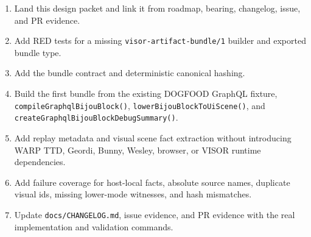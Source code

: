 \begin{enumerate}
\def\labelenumi{\arabic{enumi}.}
\tightlist
\item
  Land this design packet and link it from roadmap, bearing, changelog, issue, and PR evidence.
\item
  Add RED tests for a missing \texttt{v\allowbreak{}i\allowbreak{}s\allowbreak{}o\allowbreak{}r\allowbreak{}-\allowbreak{}a\allowbreak{}r\allowbreak{}t\allowbreak{}i\allowbreak{}f\allowbreak{}a\allowbreak{}c\allowbreak{}t\allowbreak{}-\allowbreak{}b\allowbreak{}u\allowbreak{}n\allowbreak{}d\allowbreak{}l\allowbreak{}e\allowbreak{}/\allowbreak{}1} builder and exported bundle type.
\item
  Add the bundle contract and deterministic canonical hashing.
\item
  Build the first bundle from the existing DOGFOOD GraphQL fixture, \texttt{c\allowbreak{}o\allowbreak{}m\allowbreak{}p\allowbreak{}i\allowbreak{}l\allowbreak{}e\allowbreak{}G\allowbreak{}r\allowbreak{}a\allowbreak{}p\allowbreak{}h\allowbreak{}q\allowbreak{}l\allowbreak{}B\allowbreak{}i\allowbreak{}j\allowbreak{}o\allowbreak{}u\allowbreak{}B\allowbreak{}l\allowbreak{}o\allowbreak{}c\allowbreak{}k\allowbreak{}(\allowbreak{})}, \texttt{l\allowbreak{}o\allowbreak{}w\allowbreak{}e\allowbreak{}r\allowbreak{}B\allowbreak{}i\allowbreak{}j\allowbreak{}o\allowbreak{}u\allowbreak{}B\allowbreak{}l\allowbreak{}o\allowbreak{}c\allowbreak{}k\allowbreak{}T\allowbreak{}o\allowbreak{}U\allowbreak{}i\allowbreak{}S\allowbreak{}c\allowbreak{}e\allowbreak{}n\allowbreak{}e\allowbreak{}(\allowbreak{})}, and \texttt{c\allowbreak{}r\allowbreak{}e\allowbreak{}a\allowbreak{}t\allowbreak{}e\allowbreak{}G\allowbreak{}r\allowbreak{}a\allowbreak{}p\allowbreak{}h\allowbreak{}q\allowbreak{}l\allowbreak{}B\allowbreak{}i\allowbreak{}j\allowbreak{}o\allowbreak{}u\allowbreak{}B\allowbreak{}l\allowbreak{}o\allowbreak{}c\allowbreak{}k\allowbreak{}D\allowbreak{}e\allowbreak{}b\allowbreak{}u\allowbreak{}g\allowbreak{}S\allowbreak{}u\allowbreak{}m\allowbreak{}m\allowbreak{}a\allowbreak{}r\allowbreak{}y\allowbreak{}(\allowbreak{})}.
\item
  Add replay metadata and visual scene fact extraction without introducing WARP TTD, Geordi, Bunny, Wesley, browser, or VISOR runtime dependencies.
\item
  Add failure coverage for host-local facts, absolute source names, duplicate visual ids, missing lower-mode witnesses, and hash mismatches.
\item
  Update \texttt{d\allowbreak{}o\allowbreak{}c\allowbreak{}s\allowbreak{}/\allowbreak{}C\allowbreak{}H\allowbreak{}A\allowbreak{}N\allowbreak{}G\allowbreak{}E\allowbreak{}L\allowbreak{}O\allowbreak{}G\allowbreak{}.\allowbreak{}m\allowbreak{}d}, issue evidence, and PR evidence with the real implementation and validation commands.
\end{enumerate}

